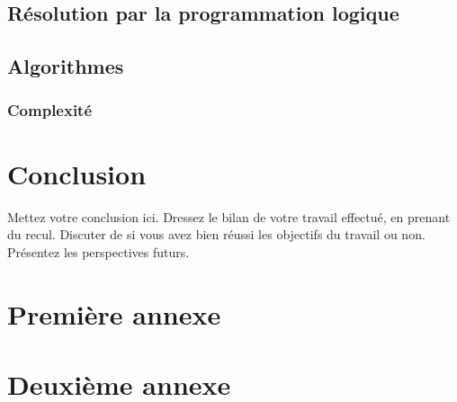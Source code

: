 \documentclass[12pt,a4paper,oneside,titlepage]{report}
\begin{document}
\section{Résolution par la programmation logique}
\section{Algorithmes}
\subsection{Complexité}







\chapter*{Conclusion}
\renewcommand{\leftmark}{CONCLUSION}

Mettez votre conclusion ici.  Dressez le bilan de votre travail effectué, en prenant du recul. Discuter de si vous avez bien réussi les objectifs du travail ou non. Présentez les perspectives futurs.

\newpage




\newpage
\appendix
{}

\chapter{Premi\`ere annexe}
\renewcommand{\leftmark}{ANNEXE \thechapter.~~Premi\`ere annexe}
\label{annexe1}

\chapter{Deuxi\`eme annexe}
\renewcommand{\leftmark}{ANNEXE \thechapter.~~Deuxi\`eme annexe}
\label{annexe2}

\end{document}

